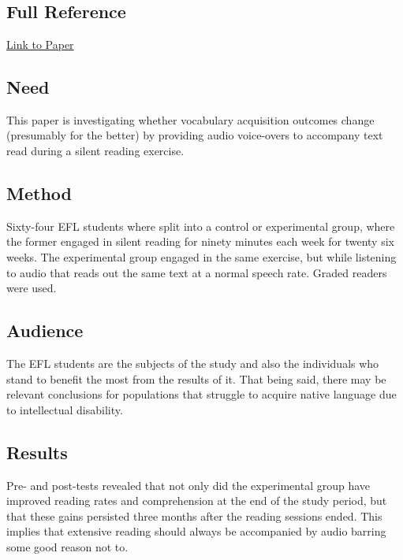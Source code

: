 \documentclass[
	letterpaper, %
]{jdf}
\begin{document}
\section{\cite{Chang2015ImprovingRR}}
\subsection{Full Reference}

\href{https://www.sciencedirect.com/science/article/pii/S0346251X15000846}{Link to Paper}

\subsection{Need}
This paper is investigating whether vocabulary acquisition outcomes change (presumably for the better) by providing audio voice-overs to accompany text read during a silent reading exercise.

\subsection{Method}
Sixty-four EFL students where split into a control or experimental group, where the former engaged in silent reading for ninety minutes each week for twenty six weeks. The experimental group engaged in the same exercise, but while listening to audio that reads out the same text at a normal speech rate. Graded readers were used.

\subsection{Audience}
The EFL students are the subjects of the study and also the individuals who stand to benefit the most from the results of it. That being said, there may be relevant conclusions for populations that struggle to acquire native language due to intellectual disability.

\subsection{Results}
Pre- and post-tests revealed that not only did the experimental group have improved reading rates and comprehension at the end of the study period, but that these gains persisted three months after the reading sessions ended. This implies that extensive reading should always be accompanied by audio barring some good reason not to.
\end{document}
